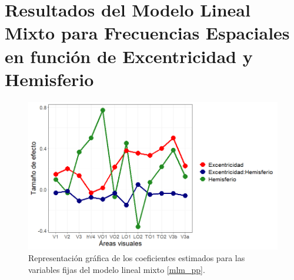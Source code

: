 \section{Resultados del Modelo Lineal Mixto para Frecuencias Espaciales en función de Excentricidad y Hemisferio}

\begin{figure}
	\centering
	\includegraphics[scale=0.6]{Graphics/effect_size_coef_pp}
	\caption{Representación gráfica de los coeficientes estimados para las variables fijas del modelo lineal mixto \ref{mlm_pp}.}
	\label{fig:coeff}
\end{figure}

